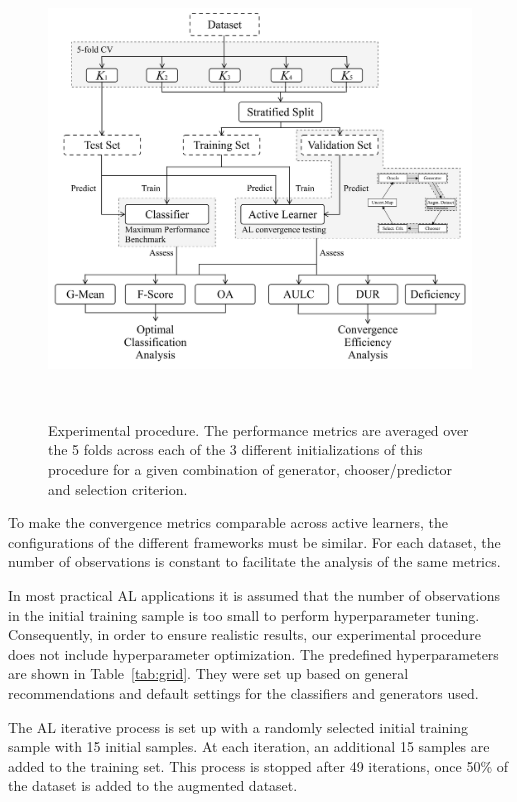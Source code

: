 \documentclass[parskip=full]{scrartcl}
\begin{document}
\begin{figure}[H]
	\centering
	\includegraphics[width=.7\linewidth]{../analysis/experiment_pipeline}
	\caption{Experimental procedure. The performance metrics are averaged over
    the 5 folds across each of the 3 different initializations of this procedure
    for a given combination of generator, chooser/predictor and selection
    criterion.}~\label{fig:experiment_pipeline}
\end{figure}

To make the convergence metrics comparable across active learners, the
configurations of the different frameworks must be similar. For each dataset,
the number of observations is constant to facilitate the analysis of the same
metrics. 

In most practical AL applications it is assumed that the number of observations
in the initial training sample is too small to perform hyperparameter tuning.
Consequently, in order to ensure realistic results, our experimental procedure
does not include hyperparameter optimization. The predefined hyperparameters are
shown in Table~\ref{tab:grid}. They were set up based on general recommendations
and default settings for the classifiers and generators used.

The AL iterative process is set up with a randomly selected initial training
sample with 15 initial samples. At each iteration, an additional 15 samples are
added to the training set. This process is stopped after 49 iterations, once
50\% of the dataset is added to the augmented dataset.
\end{document}
